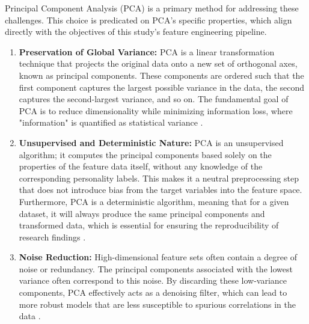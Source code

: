 Principal Component Analysis (PCA) is a primary method for addressing these challenges. This choice is predicated on PCA's specific properties, which align directly with the objectives of this study's feature engineering pipeline.
\begin{enumerate}
	\item \textbf{Preservation of Global Variance:} PCA is a linear transformation technique that projects the original data onto a new set of orthogonal axes, known as principal components. These components are ordered such that the first component captures the largest possible variance in the data, the second captures the second-largest variance, and so on. The fundamental goal of PCA is to reduce dimensionality while minimizing information loss, where "information" is quantified as statistical variance \citep{jolliffe2016}.
	
	\item \textbf{Unsupervised and Deterministic Nature:} PCA is an unsupervised algorithm; it computes the principal components based solely on the properties of the feature data itself, without any knowledge of the corresponding personality labels. This makes it a neutral preprocessing step that does not introduce bias from the target variables into the feature space. Furthermore, PCA is a deterministic algorithm, meaning that for a given dataset, it will always produce the same principal components and transformed data, which is essential for ensuring the reproducibility of research findings \citep{wold1987}.
	
	\item \textbf{Noise Reduction:} High-dimensional feature sets often contain a degree of noise or redundancy. The principal components associated with the lowest variance often correspond to this noise. By discarding these low-variance components, PCA effectively acts as a denoising filter, which can lead to more robust models that are less susceptible to spurious correlations in the data \citep{hastie2009}.
\end{enumerate}
